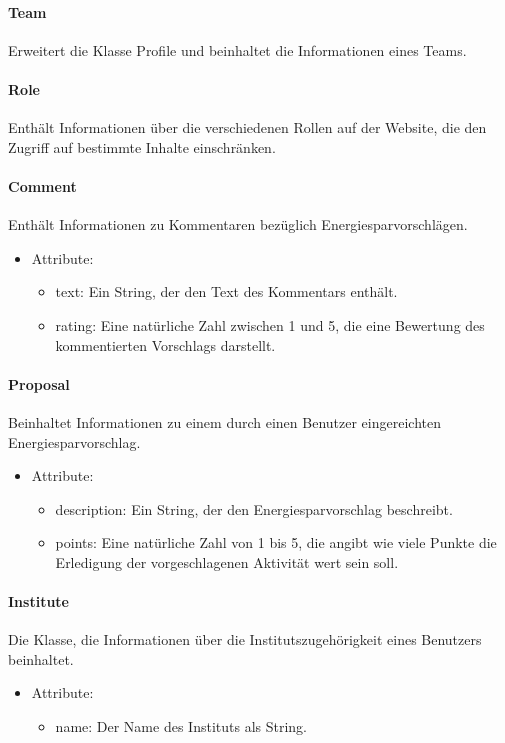 	\paragraph{Team}Erweitert die Klasse Profile und beinhaltet die Informationen eines Teams.
	\paragraph{Role}Enth\"alt Informationen \"uber die verschiedenen Rollen auf der Website, die den Zugriff auf bestimmte Inhalte einschr\"anken.
	\paragraph{Comment}Enth\"alt Informationen zu Kommentaren bez\"uglich Energiesparvorschl\"agen.
		\begin{itemize}
			\item Attribute:
			\begin{itemize}
				\item text: Ein String, der den Text des Kommentars enth\"alt.
				\item rating: Eine nat\"urliche Zahl zwischen 1 und 5, die eine Bewertung des kommentierten Vorschlags darstellt.
			\end{itemize}
		\end{itemize}
	\paragraph{Proposal}Beinhaltet Informationen zu einem durch einen Benutzer eingereichten Energiesparvorschlag.
		\begin{itemize}
			\item Attribute:
			\begin{itemize}
				\item description: Ein String, der den Energiesparvorschlag beschreibt.
				\item points: Eine nat\"urliche Zahl von 1 bis 5, die angibt wie viele Punkte die Erledigung der vorgeschlagenen Aktivit\"at wert sein soll.
			\end{itemize}
		\end{itemize}
	\paragraph{Institute}Die Klasse, die Informationen \"uber die Institutszugeh\"origkeit eines Benutzers beinhaltet.
		\begin{itemize}
			\item Attribute:
			\begin{itemize}
				\item name: Der Name des Instituts als String.
			\end{itemize}
		\end{itemize}
